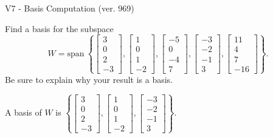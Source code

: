 \begin{exercise}
  \begin{exerciseTitle}V7 - Basis Computation (ver. 969)\end{exerciseTitle}
  \begin{exerciseStatement}
    Find a basis for the subspace 
\[W=\mathrm{span}\ \left\{\left[\begin{array}{r}
3 \\
0 \\
2 \\
-3
\end{array}\right] , \left[\begin{array}{r}
1 \\
0 \\
1 \\
-2
\end{array}\right] , \left[\begin{array}{r}
-5 \\
0 \\
-4 \\
7
\end{array}\right] , \left[\begin{array}{r}
-3 \\
-2 \\
-1 \\
3
\end{array}\right] , \left[\begin{array}{r}
11 \\
4 \\
7 \\
-16
\end{array}\right]\right\}.\]
 Be sure to explain why your result is a basis.


  \end{exerciseStatement}
  \begin{exerciseAnswer}
   A basis of \(W\) is  \(\left\{\left[\begin{array}{r}
3 \\
0 \\
2 \\
-3
\end{array}\right] , \left[\begin{array}{r}
1 \\
0 \\
1 \\
-2
\end{array}\right] , \left[\begin{array}{r}
-3 \\
-2 \\
-1 \\
3
\end{array}\right]\right\}\).
  


  \end{exerciseAnswer}
\end{exercise}